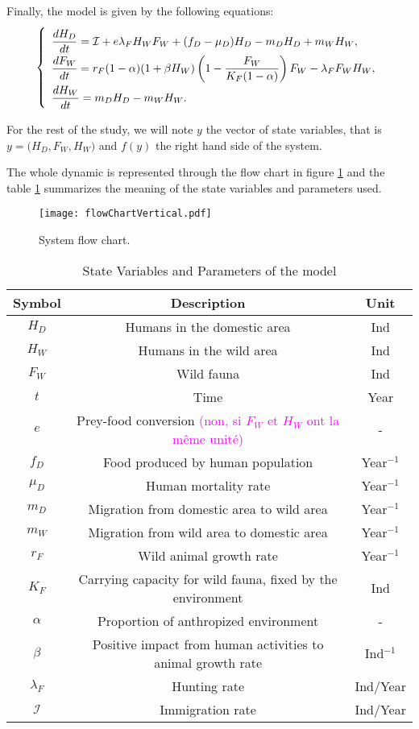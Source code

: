 \documentclass{article}
\newcommand{\lfw}{\lambda_{F}}
\newcommand{\lfw}{\lambda_{F}}
\newcommand{\cI}{\mathcal{I}}
\newcommand{\YD}[1]{\textcolor{magenta}{#1}}
\begin{document}
\medskip
Finally, the model is given by the following equations:
\begin{equation}
\def\arraystretch{2}
\left\{ 
\begin{array}{l}
\dfrac{dH_D}{dt}= \cI + e\lfw H_W F_W + (f_D - \mu_D) H_D - m_D H_D + m_W H_W, \\
\dfrac{dF_W}{dt} = r_F(1- \alpha) (1+ \beta H_W) \left(1 - \dfrac{F_W}{K_F(1-\alpha)} \right) F_W - \lfw F_W H_W,\\
\dfrac{dH_W}{dt}= m_D H_D - m_W H_W.
\end{array} \right.
\label{equation:HDFWHW}
\end{equation}

For the rest of the study, we will note $y$ the vector of state variables, that is $y = \Big(H_D, F_W, H_W \Big)$ and $f(y)$ the right hand side of the system.

The whole dynamic is represented through the flow chart in figure \ref{fig:flow chart} and the table \ref{table:symbol} summarizes the meaning of the state variables and parameters used.

\begin{figure}[!ht]
\centering
\texttt{[image: flowChartVertical.pdf]}
\caption{System flow chart.}
\label{fig:flow chart}
\end{figure}


\begin{table}[ht]
\center
\begin{tabular}{|c|c|c|}
\hline 
Symbol & Description & Unit \\ 
\hline \hline
$H_D$ & Humans in the domestic area & Ind \\
$H_W$ & Humans in the wild area & Ind \\
$F_W$ & Wild fauna & Ind \\
\hline \hline
$t$ & Time & Year \\
$e$ & Prey-food conversion \YD{(non, si $F_W$ et $H_W$ ont la même unité)} & - \\
$f_D$ & Food produced by human population & Year$^{-1}$ \\
$\mu_D$ & Human mortality rate  & Year$^{-1}$ \\
$m_D$ & Migration from domestic area to wild area & Year$^{-1}$ \\
$m_W$ & Migration from wild area to domestic area & Year$^{-1}$ \\
$r_F$ & Wild animal growth rate & Year$^{-1}$ \\
$K_F$ & Carrying capacity for wild fauna, fixed by the environment& Ind \\
$\alpha$ & Proportion of anthropized environment & - \\
$\beta$ & Positive impact from human activities to animal growth rate & Ind$^{-1}$  \\
$\lfw$ & Hunting rate & Ind/Year\\
$\mathcal{I}$ & Immigration rate &Ind/Year\\
\hline
\end{tabular}
\caption{State Variables and Parameters of the model}
\label{table:symbol}
\end{table}
\end{document}

